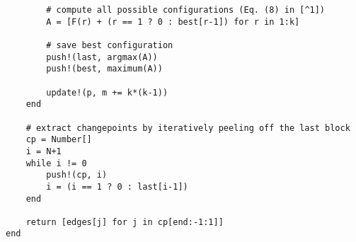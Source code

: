 \begin{lstlisting}
        # compute all possible configurations (Eq. (8) in [^1])
        A = [F(r) + (r == 1 ? 0 : best[r-1]) for r in 1:k]

        # save best configuration
        push!(last, argmax(A))
        push!(best, maximum(A))

        update!(p, m += k*(k-1))
    end

    # extract changepoints by iteratively peeling off the last block
    cp = Number[]
    i = N+1
    while i != 0
        push!(cp, i)
        i = (i == 1 ? 0 : last[i-1])
    end

    return [edges[j] for j in cp[end:-1:1]]
end
\end{lstlisting}

